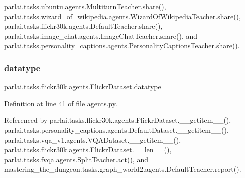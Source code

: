 parlai.\+tasks.\+ubuntu.\+agents.\+Multiturn\+Teacher.\+share(), parlai.\+tasks.\+wizard\+\_\+of\+\_\+wikipedia.\+agents.\+Wizard\+Of\+Wikipedia\+Teacher.\+share(), parlai.\+tasks.\+flickr30k.\+agents.\+Default\+Teacher.\+share(), parlai.\+tasks.\+image\+\_\+chat.\+agents.\+Image\+Chat\+Teacher.\+share(), and parlai.\+tasks.\+personality\+\_\+captions.\+agents.\+Personality\+Captions\+Teacher.\+share().

\mbox{\label{classparlai_1_1tasks_1_1flickr30k_1_1agents_1_1FlickrDataset_a0fbb201f80953f75baf8b38f685ae380}} 
\subsubsection{\texorpdfstring{datatype}{datatype}}
{\footnotesize\ttfamily parlai.\+tasks.\+flickr30k.\+agents.\+Flickr\+Dataset.\+datatype}



Definition at line 41 of file agents.\+py.



Referenced by parlai.\+tasks.\+flickr30k.\+agents.\+Flickr\+Dataset.\+\_\+\+\_\+getitem\+\_\+\+\_\+(), parlai.\+tasks.\+personality\+\_\+captions.\+agents.\+Default\+Dataset.\+\_\+\+\_\+getitem\+\_\+\+\_\+(), parlai.\+tasks.\+vqa\+\_\+v1.\+agents.\+V\+Q\+A\+Dataset.\+\_\+\+\_\+getitem\+\_\+\+\_\+(), parlai.\+tasks.\+flickr30k.\+agents.\+Flickr\+Dataset.\+\_\+\+\_\+len\+\_\+\+\_\+(), parlai.\+tasks.\+fvqa.\+agents.\+Split\+Teacher.\+act(), and mastering\+\_\+the\+\_\+dungeon.\+tasks.\+graph\+\_\+world2.\+agents.\+Default\+Teacher.\+report().

\mbox{\label{classparlai_1_1tasks_1_1flickr30k_1_1agents_1_1FlickrDataset_a72d2298eb6c0b36ce7fd24352d574131}} 
